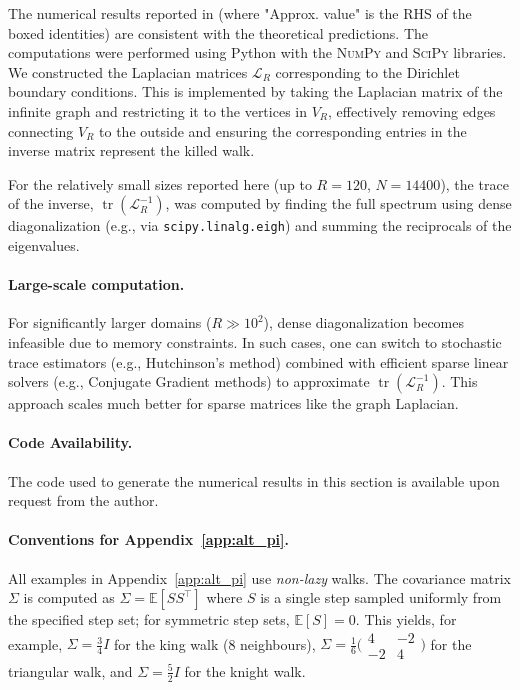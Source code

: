 \documentclass{article}
\numberwithin{equation}{section}
\theoremstyle{definition}
\theoremstyle{remark}
\DeclareMathOperator{\tr}{tr}
\begin{document}
The numerical results reported in  (where "Approx. value" is the RHS of the boxed identities) are consistent with the theoretical predictions. The computations were performed using Python with the \textsc{NumPy} and \textsc{SciPy} libraries.
We constructed the Laplacian matrices $\mathcal{L}_R$ corresponding to the Dirichlet boundary conditions. This is implemented by taking the Laplacian matrix of the infinite graph and restricting it to the vertices in $V_R$, effectively removing edges connecting $V_R$ to the outside and ensuring the corresponding entries in the inverse matrix represent the killed walk.

For the relatively small sizes reported here (up to $R=120$, $N=14400$), the trace of the inverse, $\tr(\mathcal{L}_R^{-1})$, was computed by finding the full spectrum using dense diagonalization (e.g., via \texttt{scipy.linalg.eigh}) and summing the reciprocals of the eigenvalues.

\paragraph{Large-scale computation.} For significantly larger domains ($R \gg 10^2$), dense diagonalization becomes infeasible due to memory constraints. In such cases, one can switch to stochastic trace estimators (e.g., Hutchinson's method) combined with efficient sparse linear solvers (e.g., Conjugate Gradient methods) to approximate $\tr(\mathcal{L}_R^{-1})$. This approach scales much better for sparse matrices like the graph Laplacian.

\paragraph{Code Availability.} The code used to generate the numerical results in this section is available upon request from the author.

\paragraph{Conventions for Appendix~\ref{app:alt_pi}.}
All examples in Appendix~\ref{app:alt_pi} use \emph{non-lazy} walks. The covariance matrix $\Sigma$ is computed as $\Sigma=\mathbb E[SS^\top]$ where $S$ is a single step sampled uniformly from the specified step set; for symmetric step sets, $\mathbb E[S]=0$. This yields, for example, $\Sigma=\frac{3}{4}I$ for the king walk (8 neighbours), $\Sigma=\frac{1}{6}\bigl(\begin{smallmatrix}4&-2\\-2&4\end{smallmatrix}\bigr)$ for the triangular walk, and $\Sigma=\frac{5}{2}I$ for the knight walk.
\end{document}
